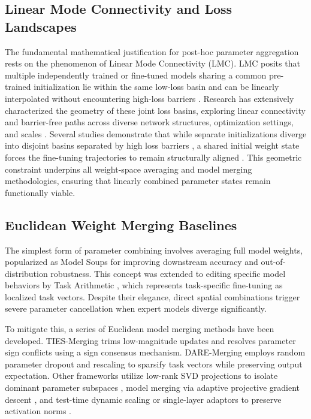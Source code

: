 \documentclass{article}
\begin{document}
\subsection{Linear Mode Connectivity and Loss Landscapes}
The fundamental mathematical justification for post-hoc parameter aggregation rests on the phenomenon of Linear Mode Connectivity (LMC). LMC posits that multiple independently trained or fine-tuned models sharing a common pre-trained initialization lie within the same low-loss basin and can be linearly interpolated without encountering high-loss barriers \cite{frankle2019_linear, entezari2021_the}. Research has extensively characterized the geometry of these joint loss basins, exploring linear connectivity and barrier-free paths across diverse network structures, optimization settings, and scales \cite{theus2025_generalized, zhan2025_analyzing, ito2025_do, zhou2023_going, ito2024_analysis, ito2025_linear, singh2024_landscaping, liang2025_exploring, hepburn2025_linear}. Several studies demonstrate that while separate initializations diverge into disjoint basins separated by high loss barriers \cite{mirzadeh2020_linear, kanoh2024_linear}, a shared initial weight state forces the fine-tuning trajectories to remain structurally aligned \cite{yunis2022_on, adilova2023_layerwise, ferbach2023_proving, altintas2023_disentangling}. This geometric constraint underpins all weight-space averaging and model merging methodologies, ensuring that linearly combined parameter states remain functionally viable.

\subsection{Euclidean Weight Merging Baselines}
The simplest form of parameter combining involves averaging full model weights, popularized as Model Soups \cite{wortsman22_soups} for improving downstream accuracy and out-of-distribution robustness. This concept was extended to editing specific model behaviors by Task Arithmetic \cite{ilharco22_editing}, which represents task-specific fine-tuning as localized task vectors. Despite their elegance, direct spatial combinations trigger severe parameter cancellation when expert models diverge significantly. 

To mitigate this, a series of Euclidean model merging methods have been developed. TIES-Merging \cite{yadav23_ties} trims low-magnitude updates and resolves parameter sign conflicts using a sign consensus mechanism. DARE-Merging \cite{yu24_dare} employs random parameter dropout and rescaling to sparsify task vectors while preserving output expectation. Other frameworks utilize low-rank SVD projections to isolate dominant parameter subspaces \cite{marczak25_saim, marczak2025_no}, model merging via adaptive projective gradient descent \cite{wei2025_modeling}, and test-time dynamic scaling or single-layer adaptors to preserve activation norms \cite{jung24_symerge, kim2025_testtime}. 
\end{document}

